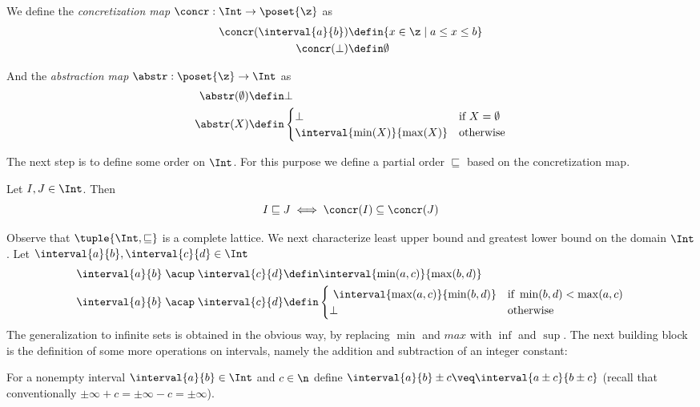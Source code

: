 \begin{definition}\label{def:concrint}
  We define the \emph{concretization map} \(\concr : \Int \to
  \poset{\z}\) as
  \begin{align*}
    \concr(\interval{a}{b}) & \defin \{x\in \z \mid a \leq x \leq b\} \\
    \concr(\bot) & \defin \emptyset
  \end{align*}

  And the \emph{abstraction map} \(\abstr:\poset{\z} \to \Int\) as
  \begin{align*}
    \abstr(\emptyset) & \defin \bot \\
    \abstr(X) & \defin
    \begin{cases}
      \bot & \text{if } X = \emptyset \\
      \interval{\min(X)}{\max(X)} & \text{otherwise}
    \end{cases}
  \end{align*}
\end{definition}
The next step is to define some order on \(\Int\). For this purpose
we define a partial order \(\sqsubseteq\) based on the concretization
map.
\begin{definition}\label{def:intpo}
  Let \(I,J \in \Int\). Then
  \begin{equation*}
    I \sqsubseteq J \iff \concr(I) \subseteq \concr(J)
  \end{equation*}
\end{definition}
Observe that \(\tuple{\Int,\sqsubseteq}\) is a complete lattice. We
next characterize least upper bound and greatest lower bound on the
domain \(\Int\). Let \({\interval{a}{b}, \interval{c}{d}\in \Int}\)
\begin{align*}
  \interval{a}{b} \; \acup \; \interval{c}{d} & \defin \interval{\min(a,c)}{\max(b,d)} \\
  \interval{a}{b} \; \acap \; \interval{c}{d} & \defin
                                                \begin{cases} \
                                                  \interval{\max(a,c)}{\min(b,d)} & \text{if } \min(b,d) < \max(a,c) \\
                                                  \bot & \text{otherwise}
                                                \end{cases}
\end{align*}
The generalization to infinite sets is obtained in the obvious way, by
replacing \(\min\) and \(max\) with \(\inf\) and \(\sup\).
\noindent
The next building block is the definition of some more operations on
intervals, namely the addition and subtraction of an integer constant:

\begin{definition}
  For a nonempty interval \(\interval{a}{b} \in \Int\) and
  \(c \in \n\) define
  \(\interval{a}{b} \pm c \veq \interval{a\pm c}{b\pm c}\) (recall
  that conventionally \(\pm \infty + c = \pm\infty - c = \pm\infty\)).
\end{definition}

